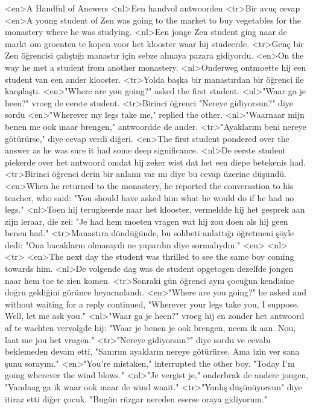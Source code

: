 <en>A Handful of Answers
<nl>Een handvol antwoorden
<tr>Bir avuç cevap
<en>A young student of Zen was going to the market to buy vegetables for the monastery where he was studying.
<nl>Een jonge Zen student ging naar de markt om groenten te kopen voor het klooster waar hij studeerde.
<tr>Genç bir Zen öğrencisi çalıştığı manastır için sebze almaya pazara gidiyordu.
<en>On the way he met a student from another monastery.
<nl>Onderweg ontmoette hij een student van een ander klooster.
<tr>Yolda başka bir manastırdan bir öğrenci ile karşılaştı.
<en>"Where are you going?" asked the first student.
<nl>"Waar ga je heen?" vroeg de eerste student.
<tr>Birinci öğrenci "Nereye gidiyorsun?" diye sordu
<en>"Wherever my legs take me," replied the other.
<nl>"Waarnaar mijn benen me ook maar brengen," antwoordde de ander.
<tr>"Ayaklarım beni nereye götürürse," diye cevap verdi diğeri.
<en>The first student pondered over the answer as he was sure it had some deep significance.
<nl>De eerste student piekerde over het antwoord omdat hij zeker wist dat het een diepe betekenis had.
<tr>Birinci öğrenci derin bir anlamı var mı diye bu cevap üzerine düşündü.
<en>When he returned to the monastery, he reported the conversation to his teacher, who said: "You should have asked him what he would do if he had no legs."
<nl>Toen hij terugkeerde naar het klooster, vermeldde hij het gesprek aan zijn leraar, die zei: "Je had hem moeten vragen wat hij zou doen als hij geen benen had."
<tr>Manastıra döndüğünde, bu sohbeti anlattığı öğretmeni şöyle dedi: "Ona bacakların olmasaydı ne yapardın diye sormalıydın." 
<en>
<nl>
<tr>
<en>The next day the student was thrilled to see the same boy coming towards him.
<nl>De volgende dag was de student opgetogen dezelfde jongen naar hem toe te zien komen.
<tr>Sonraki gün öğrenci aynı çocuğun kendisine doğru geldiğini görünce heyacanlandı.
<en>"Where are you going?" he asked and without waiting for a reply continued, "Wherever your legs take you, I suppose. Well, let me ask you."
<nl>"Waar ga je heen?" vroeg hij en zonder het antwoord af te wachten vervolgde hij: "Waar je benen je ook brengen, neem ik aan. Nou, laat me jou het vragen."
<tr>"Nereye gidiyorsun?" diye sordu ve cevabı beklemeden devam etti, "Sanırım ayakların nereye götürürse. Ama izin ver sana şunu sorayım."
<en>"You’re mistaken," interrupted the other boy. "Today I’m going wherever the wind blows."
<nl>"Je vergist je," onderbrak de andere jongen, "Vandaag ga ik waar ook maar de wind waait."
<tr>"Yanlış düşünüyorsun" diye itiraz etti diğer çocuk. "Bugün rüzgar nereden eserse oraya gidiyorum."
